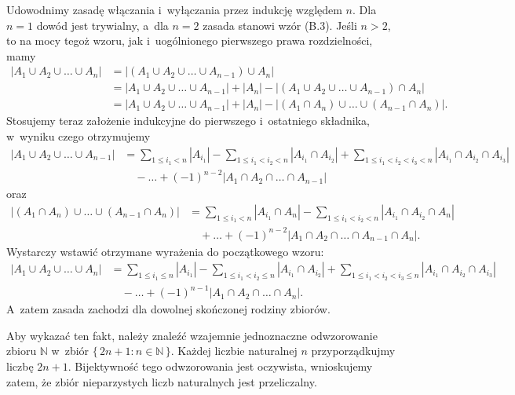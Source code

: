 \exercise %
Udowodnimy zasadę włączania i~wyłączania przez indukcję względem $n$.
Dla $n=1$ dowód jest trywialny, a~dla $n=2$ zasada stanowi wzór (B.3).
Jeśli $n>2$, to na mocy tegoż wzoru, jak i~uogólnionego pierwszego prawa rozdzielności, mamy
\begin{align*}
    |A_1\cup A_2\cup\dots\cup A_n| &= \bigl|(A_1\cup A_2\cup\dots\cup A_{n-1})\cup A_n\bigr| \\
	&= |A_1\cup A_2\cup\dots\cup A_{n-1}|+|A_n|-\bigl|(A_1\cup A_2\cup\dots\cup A_{n-1})\cap A_n\bigr| \\
	&= |A_1\cup A_2\cup\dots\cup A_{n-1}|+|A_n|-\bigl|(A_1\cap A_n)\cup\dots\cup(A_{n-1}\cap A_n)\bigr|.
\end{align*}
Stosujemy teraz założenie indukcyjne do pierwszego i~ostatniego składnika, w~wyniku czego otrzymujemy
\begin{align*}
	|A_1\cup A_2\cup\dots\cup A_{n-1}| &= \sum_{1\le i_1<n}|A_{i_1}|-\sum_{1\le i_1<i_2<n}|A_{i_1}\cap A_{i_2}|+\sum_{1\le i_1<i_2<i_3<n}|A_{i_1}\cap A_{i_2}\cap A_{i_3}| \\[1mm]
	&\quad {}-\dots+(-1)^{n-2}|A_1\cap A_2\cap\dots\cap A_{n-1}|
\end{align*}
oraz
\begin{align*}
	\bigl|(A_1\cap A_n)\cup\dots\cup(A_{n-1}\cap A_n)\bigr| &= \sum_{1\le i_1<n}|A_{i_1}\cap A_n|-\sum_{1\le i_1<i_2<n}|A_{i_1}\cap A_{i_2}\cap A_n|\\[1mm]
	&\quad {}+\dots+(-1)^{n-2}|A_1\cap A_2\cap\dots\cap A_{n-1}\cap A_n|.
\end{align*}
Wystarczy wstawić otrzymane wyrażenia do początkowego wzoru:
\begin{align*}
	|A_1\cup A_2\cup\dots\cup A_n| &= \sum_{1\le i_1\le n}|A_{i_1}|-\sum_{1\le i_1<i_2\le n}|A_{i_1}\cap A_{i_2}|+\sum_{1\le i_1<i_2<i_3\le n}|A_{i_1}\cap A_{i_2}\cap A_{i_3}| \\[1mm]
	&\quad {}-\dots+(-1)^{n-1}|A_1\cap A_2\cap\dots\cap A_n|.
\end{align*}
A~zatem zasada zachodzi dla dowolnej skończonej rodziny zbiorów.

\exercise %

\noindent Aby wykazać ten fakt, należy znaleźć wzajemnie jednoznaczne odwzorowanie zbioru $\mathbb{N}$ w~zbiór $\bigl\{\,2n+1:n\in\mathbb{N}\,\bigr\}$.
Każdej liczbie naturalnej $n$ przyporządkujmy liczbę $2n+1$.
Bijektywność tego odwzorowania jest oczywista, wnioskujemy zatem, że zbiór nieparzystych liczb naturalnych jest przeliczalny.

